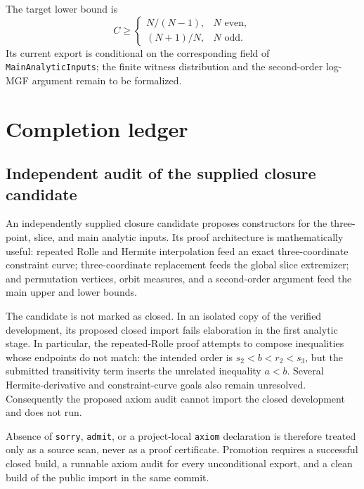 \begin{proposition}
The target lower bound is
\[
  C\ge\begin{cases}
    N/(N-1),&N\text{ even},\\
    (N+1)/N,&N\text{ odd}.
  \end{cases}
\]
Its current export is conditional on the corresponding field of
\texttt{MainAnalyticInputs}; the finite witness distribution and the
second-order log-MGF argument remain to be formalized.
\end{proposition}

\section{Completion ledger}

\subsection{Independent audit of the supplied closure candidate}

An independently supplied closure candidate proposes constructors for the
three-point, slice, and main analytic inputs. Its proof architecture is
mathematically useful: repeated Rolle and Hermite interpolation feed an exact
three-coordinate constraint curve; three-coordinate replacement feeds the
global slice extremizer; and permutation vertices, orbit measures, and a
second-order argument feed the main upper and lower bounds.

The candidate is not marked as closed. In an isolated copy of the verified
development, its proposed closed import fails elaboration in the first analytic
stage. In particular, the repeated-Rolle proof attempts to compose inequalities
whose endpoints do not match: the intended order is
\(s_2<b<r_2<s_3\), but the submitted transitivity term inserts the unrelated
inequality \(a<b\). Several Hermite-derivative and constraint-curve goals also
remain unresolved. Consequently the proposed axiom audit cannot import the
closed development and does not run.

Absence of \texttt{sorry}, \texttt{admit}, or a project-local \texttt{axiom}
declaration is therefore treated only as a source scan, never as a proof
certificate. Promotion requires a successful closed build, a runnable axiom
audit for every unconditional export, and a clean build of the public import in
the same commit.

